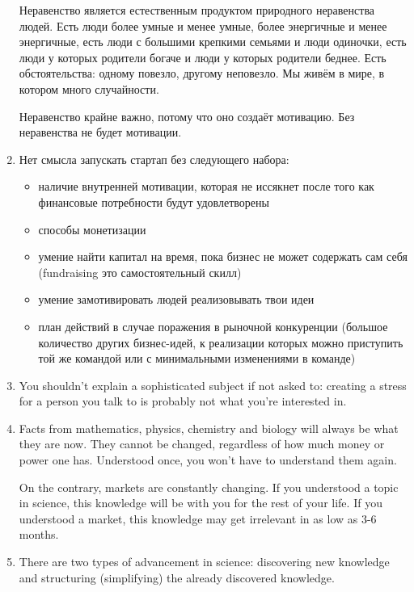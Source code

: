 \documentclass[11pt]{article}
\theoremstyle{remark}
\theoremstyle{definition}
\begin{document}
\begin{enumerate}
Неравенство является естественным продуктом природного неравенства людей. Есть люди более умные и менее умные, более энергичные и менее энергичные, есть люди с большими крепкими семьями и люди одиночки, есть люди у которых родители богаче и люди у которых родители беднее. Есть обстоятельства: одному повезло, другому неповезло. Мы живём в мире, в котором много случайности. 

Неравенство крайне важно, потому что оно создаёт мотивацию. Без неравенства не будет мотивации.



\item Нет смысла запускать стартап без следующего набора:

\begin{itemize}
\item наличие внутренней мотивации, которая не иссякнет после того как финансовые потребности будут удовлетворены
\item способы монетизации
\item умение найти капитал на время, пока бизнес не может содержать сам себя (fundraising это самостоятельный скилл)
\item умение замотивировать людей реализовывать твои идеи
\item план действий в случае поражения в рыночной конкуренции (большое количество других бизнес-идей, к реализации которых можно приступить той же командой или с минимальными изменениями в команде)

\end{itemize}


\item You shouldn't explain a sophisticated subject if not asked to: creating a stress for a person you talk to is probably not what you're interested in.


\item Facts from mathematics, physics, chemistry and biology will always be what they are now. They cannot be changed, regardless of how much money or power one has. Understood once, you won't have to understand them again.

On the contrary, markets are constantly changing. If you understood a topic in science, this knowledge will be with you for the rest of your life. If you understood a market, this knowledge may get irrelevant in as low as 3-6 months. 

\item There are two types of advancement in science: discovering new knowledge and structuring (simplifying) the already discovered knowledge. 


\end{enumerate}
\end{document}
